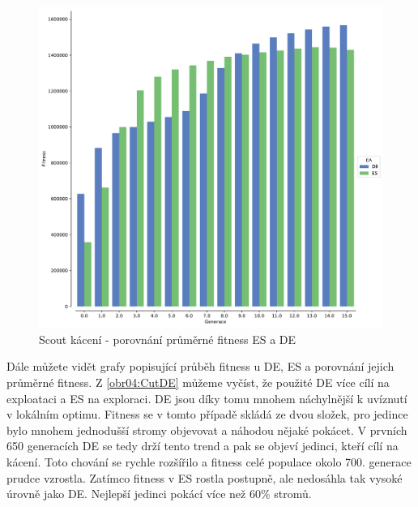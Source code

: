 	\begin{figure}[t]\centering
		\includegraphics[width=\columnwidth]{../img/WoodMap/DEvsES/WCuttorCutMem}
		\caption{Scout kácení - porovnání průměrné fitness ES a DE}
		\label{obr04:CutESvsDE}
	\end{figure}
	Dále můžete vidět grafy popisující průběh fitness u DE, ES a porovnání jejich průměrné fitness. Z \ref{obr04:CutDE} můžeme vyčíst, že použité DE více cílí na exploataci a ES na exploraci. DE jsou díky tomu mnohem náchylnější k uvíznutí v lokálním optimu.  Fitness se v tomto případě skládá ze dvou složek, pro jedince bylo mnohem jednodušší stromy objevovat a náhodou nějaké pokácet. V prvních 650 generacích DE se tedy drží tento trend a pak se objeví jedinci, kteří cílí na kácení. Toto chování se rychle rozšířilo a fitness celé populace okolo 700. generace prudce vzrostla. Zatímco fitness v ES rostla postupně, ale nedosáhla tak vysoké úrovně jako DE. Nejlepší jedinci pokácí více než 60\% stromů. 
